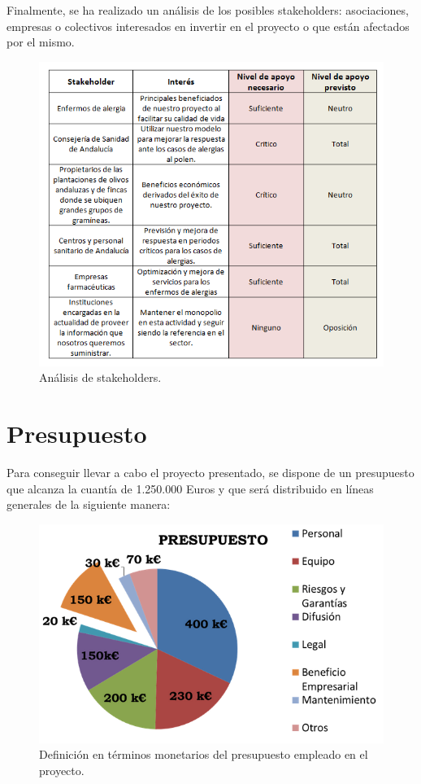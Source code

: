 \documentclass[12pt,oneside,a4paper]{article}
\numberwithin{figure}{section}
\begin{document}
Finalmente, se ha realizado un análisis de los posibles stakeholders: asociaciones, empresas o colectivos interesados en invertir en el proyecto o que están afectados por el mismo.

\begin{figure}[H]
\begin{center}
\includegraphics[scale=.7]{stakeholders.png}
\caption{Análisis de stakeholders.}
\label{fig:stakeholders}
\end{center}
\end{figure}
\clearpage



\section{Presupuesto}

Para conseguir llevar a cabo el proyecto presentado, se dispone de un presupuesto que alcanza la cuantía de 1.250.000 Euros y que será distribuido en líneas generales de la siguiente manera:

\begin{figure}[H]
\begin{center}
\includegraphics[scale=.9]{Presupuesto.png}
\caption{Definición en términos monetarios del presupuesto empleado en el proyecto.}
\label{fig:Pres1}
\end{center}
\end{figure}
\end{document}

